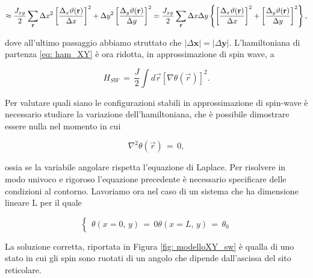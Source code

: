 \begin{equation*}
    \approx \frac{J_{xy}}{2} \sum_{\mathbf{r}} \Delta x^2 \left[ \frac{\Delta_x \vartheta (\mathbf{r})}{\Delta x} \right]^2 + 
    \Delta y^2 \left[ \frac{\Delta_y \vartheta (\mathbf{r})}{\Delta y} \right]^2 = \\ \frac{J_{xy}}{2} \sum_{\mathbf{r}} \Delta x 
    \Delta y  \left\{ \left[ \frac{\Delta_x \vartheta (\mathbf{r})}{\Delta x} \right]^2 + \left[ \frac{\Delta_y \vartheta 
    (\mathbf{r})}{\Delta y} \right]^2 \right\},
\end{equation*}

dove all'ultimo passaggio abbiamo struttato che $|\Delta \mathbf{x}| = |\Delta \mathbf{y}|$. L'hamiltoniana di partenza \eqref{eq: ham_XY} 
è ora ridotta, in approssimazione di spin wave, a 

\begin{equation}
    H_{SW}\,=\,\frac{J}{2}\int d\vec{r} \left[\nabla \theta \left(\vec{r}\right)\right]^2.
    \label{eq: ham_XY_SW}
\end{equation}

Per valutare quali siano le configurazioni stabili in approssimazione di spin-wave è necessario studiare la variazione 
dell'hamiltoniana, che è possibile dimostrare essere nulla nel momento in cui 

\begin{equation}
    \nabla^2 \theta \left(\vec{r}\right)\,=\,0, 
    \label{eq: LE}
\end{equation}

ossia se la variabile angolare rispetta l'equazione di Laplace. Per risolvere in modo univoco e rigoroso l'equazione precedente è 
necessario specificare delle condizioni al contorno. Lavoriamo ora nel caso di un sistema che ha dimensione lineare L per il quale 

\begin{equation}
    \begin{cases}
        \theta\left(x=0,\,y\right)\,=\,0
        \theta\left(x=L,\,y\right)\,=\,\theta_0
    \end{cases}
    \label{eq: cont_LE}
\end{equation}

La soluzione corretta, riportata in Figura \ref{fig: modelloXY_sw} è qualla di uno stato in cui gli spin sono ruotati di un angolo che dipende dall'ascissa del sito reticolare. 

